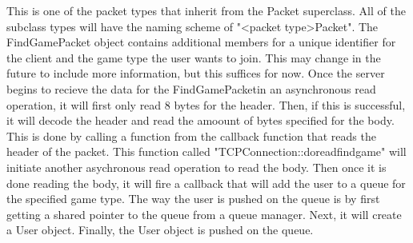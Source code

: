 \documentclass[conference]{IEEEtran}
\begin{document}
This is one of the packet types that inherit from the Packet superclass.
All of the subclass types will have the naming scheme of "<packet type>Packet".
The FindGamePacket object contains additional members for a unique identifier for the client and the game type the user wants to join.
This may change in the future to include more information, but this suffices for now.
Once the server begins to recieve the data for the FindGamePacketin an asynchronous read operation, it will first only read 8 bytes for the header.
Then, if this is successful, it will decode the header and read the amoount of bytes specified for the body.
This is done by calling a function from the callback function that reads the header of the packet.
This function called "TCPConnection::do\textunderscore read\textunderscore find\textunderscore game\textunderscorebody" will initiate another asychronous read operation to read the body.
Then once it is done reading the body, it will fire a callback that will add the user to a queue for the specified game type.
The way the user is pushed on the queue is by first getting a shared pointer to the queue from a queue manager.
Next, it will create a User object.
Finally, the User object is pushed on the queue.
\end{document}
